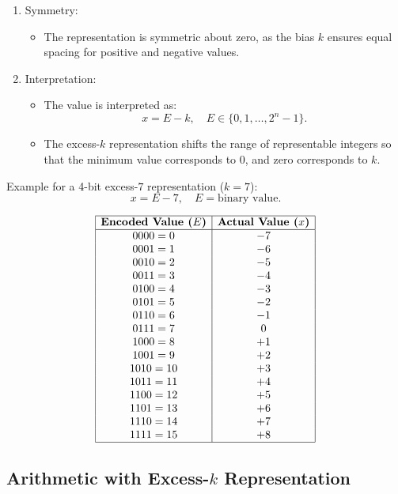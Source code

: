 \begin{enumerate}[left=1cm]
    \item Symmetry:
    \begin{itemize}
        \item The representation is symmetric about zero, as the bias \( k \) ensures equal spacing for positive and negative values.
    \end{itemize}

    \item Interpretation:
    \begin{itemize}
        \item The value is interpreted as:
        \[
        x = E - k, \quad E \in \{0, 1, \dots, 2^n - 1\}.
        \]
        \item The excess-\( k \) representation shifts the range of representable integers so that the minimum value corresponds to \( 0 \), and zero corresponds to \( k \).
    \end{itemize}
\end{enumerate}

Example for a 4-bit excess-\( 7 \) representation (\( k = 7 \)):
\[
x = E - 7, \quad E = \text{binary value}.
\]

\[
\begin{array}{|c|c|}
\hline
\textbf{Encoded Value (\( E \))} & \textbf{Actual Value (\( x \))} \\
\hline
0000 = 0 & -7 \\
0001 = 1 & -6 \\
0010 = 2 & -5 \\
0011 = 3 & -4 \\
0100 = 4 & -3 \\
0101 = 5 & -2 \\
0110 = 6 & -1 \\
0111 = 7 & 0 \\
1000 = 8 & +1 \\
1001 = 9 & +2 \\
1010 = 10 & +3 \\
1011 = 11 & +4 \\
1100 = 12 & +5 \\
1101 = 13 & +6 \\
1110 = 14 & +7 \\
1111 = 15 & +8 \\
\hline
\end{array}
\]


\subsection{Arithmetic with Excess-\( k \) Representation}
